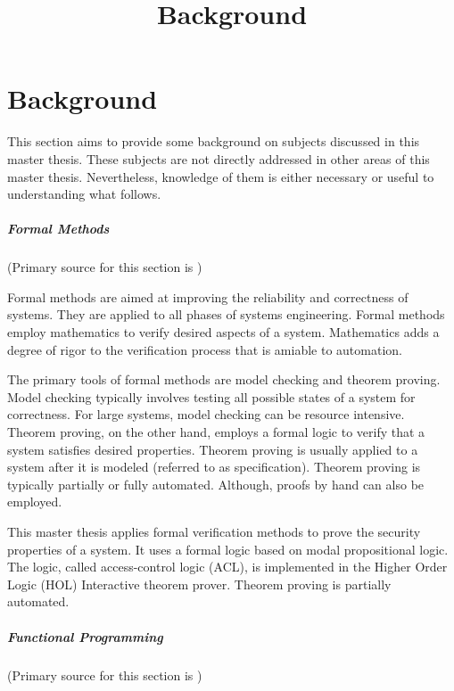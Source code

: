 \documentclass[../../main/main.tex]{subfiles}
\begin{document}
\title{Background}

\chapter{Background}
This section aims to provide some background on subjects discussed in this master thesis.  These subjects are not directly addressed in other areas of this master thesis.  Nevertheless, knowledge of them is either necessary or useful to understanding what follows.

\paragraph*{Formal Methods}
(Primary source for this section is \cite{wikiformalmethods})

Formal methods are aimed at improving the reliability and correctness of systems\cite{formalmethodslcarke}.  They are applied to all phases of systems engineering.  Formal methods employ mathematics to verify desired aspects of a system.  Mathematics adds a degree of rigor to the verification process that is amiable to automation.  

The primary tools of formal methods are model checking and theorem proving.  Model checking typically involves testing all possible states of a system for correctness. For large systems, model checking can be resource intensive.  Theorem proving, on the other hand, employs a formal logic to verify that a system satisfies desired properties.  Theorem proving is usually applied to a system after it is modeled (referred to as specification).   Theorem proving is typically partially or fully automated.  Although, proofs by hand can also be employed. 

This master thesis applies formal verification methods to prove the security properties of a system. It uses a formal logic based on modal propositional logic.  The logic, called access-control logic (ACL), is implemented in the Higher Order Logic (HOL) Interactive theorem prover.  Theorem proving is partially automated. 

\paragraph*{Functional Programming}
(Primary source for this section is \cite{functionalprogramming})
\end{document}
